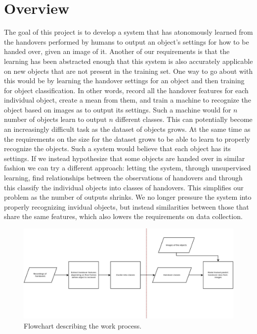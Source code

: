 \section{Overview}

The goal of this project is to develop a system that has atonomously learned from the handovers performed by humans to output an object's settings for how to be handed over, given an image of it. Another of our requirements is that the learning has been abstracted enough that this system is also accurately applicable on new objects that are not present in the training set. One way to go about with this would be by learning the handover settings for an object and then training for object classification. In other words, record all the handover features for each individual object, create a mean from them, and train a machine to recognize the object based on images as to output its settings. Such a machine would for \(n\) number of objects learn to output \(n\) different classes. This can potentially become an increasingly difficult task as the dataset of objects grows. At the same time as the requirements on the size for the dataset grows to be able to learn to properly recognize the objects. Such a system would believe that each object has its settings. If we instead hypothesize that some objects are handed over in similar fashion we can try a different approach:  letting the system, through unsupervised learning, find relationships between the observations of handovers and through this classify the individual objects into classes of handovers. This simplifies our problem as the number of outputs shrinks. We no longer pressure the system into properly recognizing invidual objects, but instead similarities between those that share the same features, which also lowers the requirements on data collection.

\begin{figure}
	\centering
	\includegraphics[width=\textwidth]{img/methods/flowchart.jpg}
	\caption{Flowchart describing the work process.}
	\label{fig:flowchart}
\end{figure}


